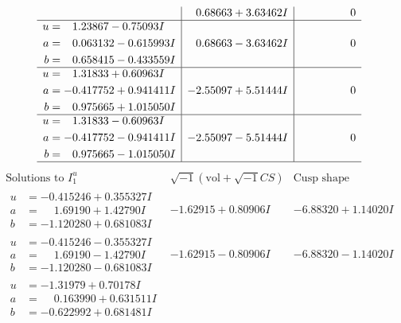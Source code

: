 \documentclass[1p]{elsarticle_modified}
\theoremstyle{definition}
\newcommand{\I}{\sqrt{-1}}
\begin{document}
$$\begin{array}{c|c|c}
 & \phantom{-}0.68663 + 3.63462 I & \phantom{-0.000000 } 0 \\ \hline\begin{aligned}
u &= \phantom{-}1.23867 - 0.75093 I \\
a &= \phantom{-}0.063132 - 0.615993 I \\
b &= \phantom{-}0.658415 - 0.433559 I\end{aligned}
 & \phantom{-}0.68663 - 3.63462 I & \phantom{-0.000000 } 0 \\ \hline\begin{aligned}
u &= \phantom{-}1.31833 + 0.60963 I \\
a &= -0.417752 + 0.941411 I \\
b &= \phantom{-}0.975665 + 1.015050 I\end{aligned}
 & -2.55097 + 5.51444 I & \phantom{-0.000000 } 0 \\ \hline\begin{aligned}
u &= \phantom{-}1.31833 - 0.60963 I \\
a &= -0.417752 - 0.941411 I \\
b &= \phantom{-}0.975665 - 1.015050 I\end{aligned}
 & -2.55097 - 5.51444 I & \phantom{-0.000000 } 0\\
 \hline 
 \end{array}$$\newpage$$\begin{array}{c|c|c}  
\text{Solutions to }I^u_{1}& \I (\text{vol} + \sqrt{-1}CS) & \text{Cusp shape}\\
 \hline 
\begin{aligned}
u &= -0.415246 + 0.355327 I \\
a &= \phantom{-}1.69190 + 1.42790 I \\
b &= -1.120280 + 0.681083 I\end{aligned}
 & -1.62915 + 0.80906 I & -6.88320 + 1.14020 I \\ \hline\begin{aligned}
u &= -0.415246 - 0.355327 I \\
a &= \phantom{-}1.69190 - 1.42790 I \\
b &= -1.120280 - 0.681083 I\end{aligned}
 & -1.62915 - 0.80906 I & -6.88320 - 1.14020 I \\ \hline\begin{aligned}
u &= -1.31979 + 0.70178 I \\
a &= \phantom{-}0.163990 + 0.631511 I \\
b &= -0.622992 + 0.681481 I\end{aligned}

\end{array}$$
\end{document}
